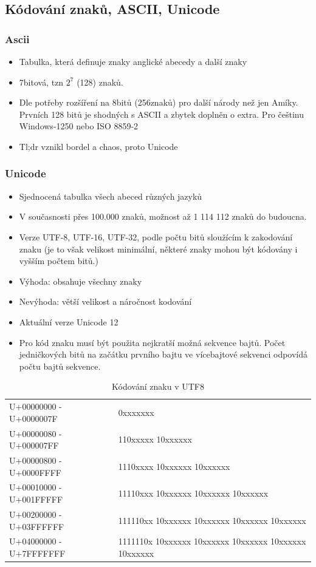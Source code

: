 \documentclass[10pt,a4paper]{article}
\begin{document}
\subsection{Kódování znaků, ASCII, Unicode}
\subsubsection{Ascii}
\begin{itemize}
\item Tabulka, která definuje znaky anglické abecedy a další znaky
\item 7bitová, tzn $2^7$ (128) znaků.
\item Dle potřeby rozšíření na 8bitů (256znaků) pro další národy než jen Amíky. Prvních 128 bitů je shodných s ASCII a zbytek doplněn o extra. Pro češtinu Windows-1250 nebo ISO 8859-2
\item Tl;dr vznikl bordel a chaos, proto Unicode
\end{itemize}


\subsubsection{Unicode}
\begin{itemize}
\item Sjednocená tabulka všech abeced různých jazyků
\item V současnosti přes 100.000 znaků, možnost až 1 114 112 znaků do budoucna.
\item Verze UTF-8, UTF-16, UTF-32, podle počtu bitů sloužícím k zakodování znaku (je to však velikost minimální, některé znaky mohou být kódovány i vyšším počtem bitů.)
\item Výhoda: obsahuje všechny znaky
\item Nevýhoda: větší velikost a náročnost kodování
\item Aktuální verze Unicode 12
\item Pro kód znaku musí být použita nejkratší možná sekvence bajtů. Počet jedničkových bitů na začátku prvního bajtu ve vícebajtové sekvenci odpovídá počtu bajtů sekvence.
\end{itemize}
\begin{table}[ht]
\centering
\begin{tabular}{l|l}
\hline
U+00000000 - U+0000007F & 0xxxxxxx                                              \\
U+00000080 - U+000007FF & 110xxxxx 10xxxxxx                                     \\
U+00000800 - U+0000FFFF & 1110xxxx 10xxxxxx 10xxxxxx                            \\
U+00010000 - U+001FFFFF & 11110xxx 10xxxxxx 10xxxxxx 10xxxxxx                   \\
U+00200000 - U+03FFFFFF & 111110xx 10xxxxxx 10xxxxxx 10xxxxxx 10xxxxxx          \\
U+04000000 - U+7FFFFFFF & 1111110x 10xxxxxx 10xxxxxx 10xxxxxx 10xxxxxx 10xxxxxx \\
\hline
\end{tabular}
\caption{Kódování znaku v UTF8}
\label{tab:utf8}
\end{table}
\end{document}
